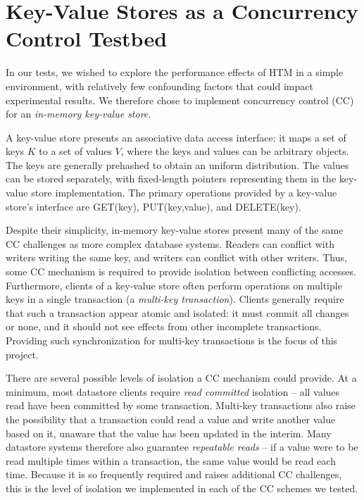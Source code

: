 \section{Key-Value Stores as a Concurrency Control Testbed} \label{sec:problem}

In our tests, we wished to explore the performance effects of HTM in a simple
environment, with relatively few confounding factors that could impact
experimental results. We therefore chose to implement concurrency control (CC)
for an \textit{in-memory key-value store}.

A key-value store presents an associative data access interface: it maps a set
of keys $K$ to a set of values $V$, where the keys and values can be arbitrary
objects. The keys are generally prehashed to obtain an uniform distribution. The
values can be stored separately, with fixed-length pointers representing them in
the key-value store implementation. The primary operations provided by a
key-value store's interface are \textsc{GET}(key), \textsc{PUT}(key,value), and
\textsc{DELETE}(key).

Despite their simplicity, in-memory key-value stores present many of the same CC
challenges as more complex database systems. Readers can conflict with writers
writing the same key, and writers can conflict with other writers. Thus, some CC
mechanism is required to provide isolation between conflicting
accesses. Furthermore, clients of a key-value store often perform operations on
multiple keys in a single transaction (a \textit{multi-key
  transaction}). Clients generally require that such a transaction appear atomic
and isolated: it must commit all changes or none, and it should not see effects
from other incomplete transactions. Providing such synchronization for multi-key
transactions is the focus of this project.

There are several possible levels of isolation a CC mechanism could provide. At
a minimum, most datastore clients require \textit{read committed} isolation --
all values read have been committed by some transaction. Multi-key transactions
also raise the possibility that a transaction could read a value and write
another value based on it, unaware that the value has been updated in the
interim. Many datastore systems therefore also guarantee \textit{repeatable
  reads} -- if a value were to be read multiple times within a transaction, the
same value would be read each time. Because it is so frequently required and
raises additional CC challenges, this is the level of isolation we implemented
in each of the CC schemes we tested.
